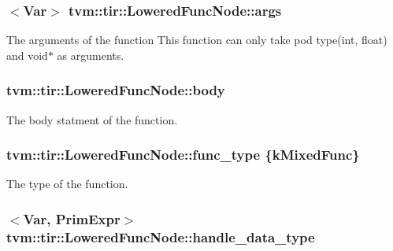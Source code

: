 \subsubsection[{\texorpdfstring{args}{args}}]{$<${\bf Var}$>$ tvm\+::tir\+::\+Lowered\+Func\+Node\+::args}\hypertarget{classtvm_1_1tir_1_1LoweredFuncNode_aef9d2a7ee866a22b3bd65f8c29a6016e}{}\label{classtvm_1_1tir_1_1LoweredFuncNode_aef9d2a7ee866a22b3bd65f8c29a6016e}


The arguments of the function This function can only take pod type(int, float) and void$\ast$ as arguments. 

\subsubsection[{\texorpdfstring{body}{body}}]{ tvm\+::tir\+::\+Lowered\+Func\+Node\+::body}\hypertarget{classtvm_1_1tir_1_1LoweredFuncNode_a9cc563727ba34c90efb647195be90f8d}{}\label{classtvm_1_1tir_1_1LoweredFuncNode_a9cc563727ba34c90efb647195be90f8d}


The body statment of the function. 

\subsubsection[{\texorpdfstring{func\+\_\+type}{func_type}}]{ tvm\+::tir\+::\+Lowered\+Func\+Node\+::func\+\_\+type \{{\bf k\+Mixed\+Func}\}}\hypertarget{classtvm_1_1tir_1_1LoweredFuncNode_aa59a716bf8a2ca84fb2b20a0fa1e25a4}{}\label{classtvm_1_1tir_1_1LoweredFuncNode_aa59a716bf8a2ca84fb2b20a0fa1e25a4}


The type of the function. 

\subsubsection[{\texorpdfstring{handle\+\_\+data\+\_\+type}{handle_data_type}}]{$<${\bf Var}, {\bf Prim\+Expr}$>$ tvm\+::tir\+::\+Lowered\+Func\+Node\+::handle\+\_\+data\+\_\+type}\hypertarget{classtvm_1_1tir_1_1LoweredFuncNode_a95a0481bbb70cdedde6b73717f49c1bc}{}\label{classtvm_1_1tir_1_1LoweredFuncNode_a95a0481bbb70cdedde6b73717f49c1bc}


